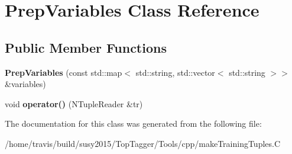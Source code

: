 \hypertarget{classPrepVariables}{\section{Prep\-Variables Class Reference}
\label{classPrepVariables}
}
\subsection*{Public Member Functions}
\begin{DoxyCompactItemize}
\item 
\hypertarget{classPrepVariables_afaef5c27456a679614be6b4eba5be2a5}{{\bfseries Prep\-Variables} (const std\-::map$<$ std\-::string, std\-::vector$<$ std\-::string $>$$>$ \&variables)}\label{classPrepVariables_afaef5c27456a679614be6b4eba5be2a5}

\item 
\hypertarget{classPrepVariables_aed38f9b1b9087c13d9380b04ab6c598e}{void {\bfseries operator()} (N\-Tuple\-Reader \&tr)}\label{classPrepVariables_aed38f9b1b9087c13d9380b04ab6c598e}

\end{DoxyCompactItemize}


The documentation for this class was generated from the following file\-:\begin{DoxyCompactItemize}
\item 
/home/travis/build/susy2015/\-Top\-Tagger/\-Tools/cpp/make\-Training\-Tuples.\-C\end{DoxyCompactItemize}
